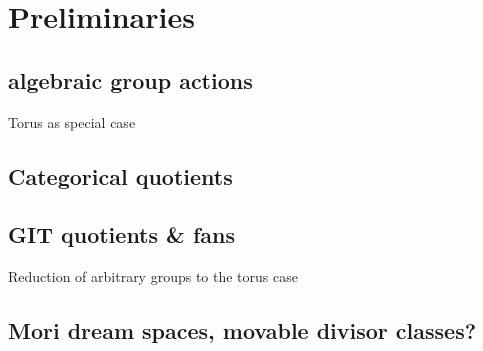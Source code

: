 \chapter{Preliminaries}

\section{algebraic group actions}
Torus as special case

\section{Categorical quotients}

\section{GIT quotients \& fans}
Reduction of arbitrary groups to the torus case

\section{Mori dream spaces, movable divisor classes?}